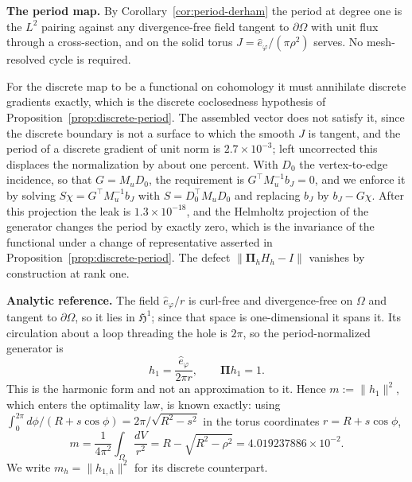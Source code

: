 \documentclass{article}
\newcommand{\HH}{\mathfrak H}
\newcommand{\Piop}{\boldsymbol\Pi}
\newcommand{\norm}[1]{\lVert #1\rVert}
\begin{document}
\medskip
\noindent\textbf{The period map.}
By Corollary~\ref{cor:period-derham} the period at degree one is the $L^{2}$
pairing against any divergence-free field tangent to $\partial\Omega$ with
unit flux through a cross-section, and on the solid torus
$J=\hat e_{\varphi}/(\pi\rho^{2})$ serves. No mesh-resolved cycle is required.

For the discrete map to be a functional on cohomology it must annihilate
discrete gradients exactly, which is the discrete coclosedness hypothesis of
Proposition~\ref{prop:discrete-period}. The assembled vector does not satisfy
it, since the discrete boundary is not a surface to which the smooth $J$ is
tangent, and the period of a discrete gradient of unit norm is
$2.7\times10^{-3}$; left uncorrected this displaces the normalization by about
one percent. With $D_{0}$ the vertex-to-edge incidence, so that
$G=M_{u}D_{0}$, the requirement is $G^{\top}M_{u}^{-1}b_{J}=0$, and we enforce
it by solving $S\chi=G^{\top}M_{u}^{-1}b_{J}$ with $S=D_{0}^{\top}M_{u}D_{0}$
and replacing $b_{J}$ by $b_{J}-G\chi$. After this projection the leak is
$1.3\times10^{-18}$, and the Helmholtz projection of the generator changes the
period by exactly zero, which is the invariance of the functional under a
change of representative asserted in Proposition~\ref{prop:discrete-period}.
The defect $\norm{\Piop_{h}H_{h}-I}$ vanishes by construction at rank one.

\medskip
\noindent\textbf{Analytic reference.}
The field $\hat e_{\varphi}/r$ is curl-free and divergence-free on $\Omega$
and tangent to $\partial\Omega$, so it lies in $\HH^{1}$; since that space is
one-dimensional it spans it. Its circulation about a loop threading the hole
is $2\pi$, so the period-normalized generator is
\begin{equation}\label{eq:torus-h-exact}
  h_{1}=\frac{\hat e_{\varphi}}{2\pi r},\qquad \Piop h_{1}=1 .
\end{equation}
This is the harmonic form and not an approximation to it. Hence
$m:=\norm{h_{1}}^{2}$, which enters the optimality law, is known exactly:
using $\int_{0}^{2\pi}d\phi/(R+s\cos\phi)=2\pi/\sqrt{R^{2}-s^{2}}$ in the
torus coordinates $r=R+s\cos\phi$,
\begin{equation}\label{eq:m-exact}
  m=\frac{1}{4\pi^{2}}\int_{\Omega}\frac{dV}{r^{2}}
   =R-\sqrt{R^{2}-\rho^{2}}
   =4.019237886\times10^{-2}.
\end{equation}
We write $m_{h}=\norm{h_{1,h}}^{2}$ for its discrete counterpart.
\end{document}
